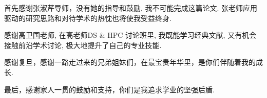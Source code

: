 \begin{thanks}
  首先感谢张淑芹导师，没有她的指导和鼓励, 我不可能完成这篇论文. 
  张老师应用驱动的研究思路和对待学术的热忱也将使我受益终身.

  感谢高卫国老师, 在高老师DS \& HPC 讨论班里, 我既能学习经典文献, 
  又有机会接触前沿学术讨论, 极大地提升了自己的专业技能.

  感谢复旦，感谢一路走过来的兄弟姐妹们，在最宝贵年华里，是你们伴随着我的成长.

  最后，感谢家人一贯的鼓励和支持，你们是我追求学业的坚强后盾.

\end{thanks}
